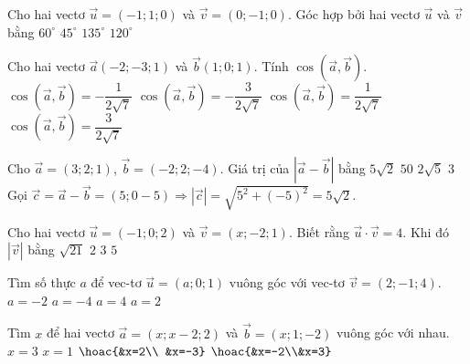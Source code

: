\begin{ex}
	Cho hai vectơ $ \vec{u}=(-1;1;0) $ và $ \vec{v}=(0;-1;0) $. Góc hợp bởi hai vectơ $ \vec{u} $ và $ \vec{v} $ bằng
	\choice
	{$ 60^\circ $}
	{$ 45^\circ $}
	{\True $ 135^\circ $}
	{$ 120^\circ $}
\end{ex} 

\begin{ex}
	Cho hai vectơ $ \vec{a}(-2;-3;1) $ và $ \vec{b}(1;0;1) $. Tính $ \cos(\vec{a},\vec{b}) $.
	\choice
	{\True $ \cos(\vec{a},\vec{b})=-\dfrac{1}{2\sqrt{7}} $}
	{$ \cos(\vec{a},\vec{b})=-\dfrac{3}{2\sqrt{7}} $}
	{$ \cos(\vec{a},\vec{b})=\dfrac{1}{2\sqrt{7}} $}
	{$ \cos(\vec{a},\vec{b})=\dfrac{3}{2\sqrt{7}} $}
\end{ex} 

\begin{ex}
	Cho $\vec{a}=(3;2;1)$, $\vec{b}=(-2;2;-4)$. Giá trị của $\left| \vec{a}-\vec{b} \right|$ bằng
	\choice
	{\True$5\sqrt{2}$}
	{$50$}
	{$2\sqrt{5}$}
	{$3$}
	\loigiai
	{
		Gọi $\vec{c}=\vec{a}-\vec{b}=(5;0-5)\Rightarrow \left| \vec{c} \right|=\sqrt{5^2+(-5)^2}=5\sqrt{2}$.}
\end{ex} 

\begin{ex}
	Cho hai vectơ $\vec{u}=(-1;0;2)$ và $\vec{v}=(x;-2;1)$. Biết rằng $\vec{u}\cdot \vec{v}=4$. Khi đó $|\vec{v}|$ bằng
	\choice
	{$\sqrt{21}$}
	{$2$}
	{\True $3$}
	{$5$}
\end{ex} 

\begin{ex}%
	Tìm số thực $a$ để vec-tơ $\vec{u}=(a;0;1)$ vuông góc với vec-tơ $\vec{v}=(2;-1;4)$.
	\choice
	{\True $a=-2$}
	{$a=-4$}
	{$a=4$}
	{$a=2$}
\end{ex} 

\begin{ex}
	Tìm $x$ để hai vectơ $\vec{a}=(x;x-2;2)$ và $\vec{b}=(x;1;-2)$ vuông góc với nhau.
	\choice
	{$x=3$}
	{$x=1$}
	{\True $\hoac{&x=2\\ &x=-3}$}
	{$\hoac{&x=-2\\&x=3}$}
\end{ex} 

